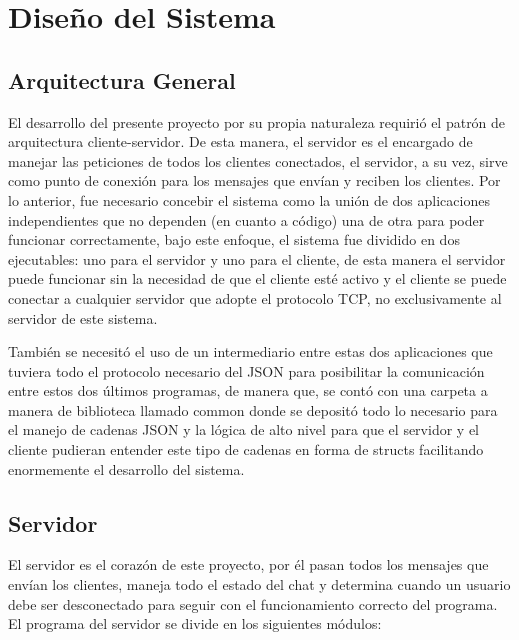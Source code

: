 \documentclass[12pt]{article}
\begin{document}
\section{Diseño del Sistema}

\subsection{Arquitectura General}

El desarrollo del presente proyecto por su propia naturaleza requirió el patrón de arquitectura cliente-servidor. De esta manera, el servidor es el encargado de manejar las peticiones de todos los clientes conectados, el servidor, a su vez, sirve como punto de conexión para los mensajes que envían y reciben los clientes. Por lo anterior, fue necesario concebir el sistema como la unión de dos aplicaciones independientes que no dependen (en cuanto a código) una de otra para poder funcionar correctamente, bajo este enfoque, el sistema fue dividido en dos ejecutables: uno para el servidor y uno para el cliente, de esta manera el servidor puede funcionar sin la necesidad de que el cliente esté activo y el cliente se puede conectar a cualquier servidor que adopte el protocolo TCP, no exclusivamente al servidor de este sistema.

También se necesitó el uso de un intermediario entre estas dos aplicaciones que tuviera todo el protocolo necesario del JSON para posibilitar la comunicación entre estos dos últimos programas, de manera que, se contó con una carpeta a manera de biblioteca llamado common donde se depositó todo lo necesario para el manejo de cadenas JSON y la lógica de alto nivel para que el servidor y el cliente pudieran entender este tipo de cadenas en forma de structs facilitando enormemente el desarrollo del sistema.

\subsection{Servidor}

El servidor es el corazón de este proyecto, por él pasan todos los mensajes que envían los clientes, maneja todo el estado del chat y determina cuando un usuario debe ser desconectado para seguir con el funcionamiento correcto del programa. El programa del servidor se divide en los siguientes módulos:
\end{document}
